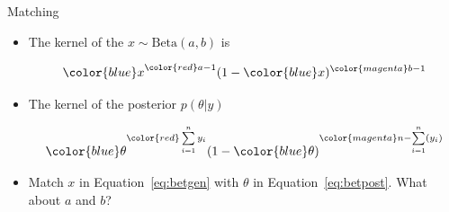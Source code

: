 \documentclass[10pt]{beamer}
\begin{document}
\begin{frame}{Matching}
  \begin{itemize}
  \item The kernel of the $x\sim\mbox{Beta}(a,b)$ is


    {\begin{equation}
        {\color{blue} x}^{{\color{red} a-1}}(1-{\color{blue} x})^{{\color{magenta} b-1}}
        \label{eq:betgen}
      \end{equation}}

  \item The kernel of the posterior $p(\theta|y)$

    \begin{equation}
      {\color{blue} \theta}^{{\color{red}\sum\limits_{i=1}^ny_i}}(1-{\color{blue} \theta})^{{\color{magenta} n-\sum\limits_{i=1}^n(y_i)}}
      \label{eq:betpost}
    \end{equation}


  \item Match $x$ in Equation~\ref{eq:betgen} with $\theta$ in Equation~\ref{eq:betpost}. What about $a$ and $b$?

  \end{itemize}
\end{frame}
\end{document}
